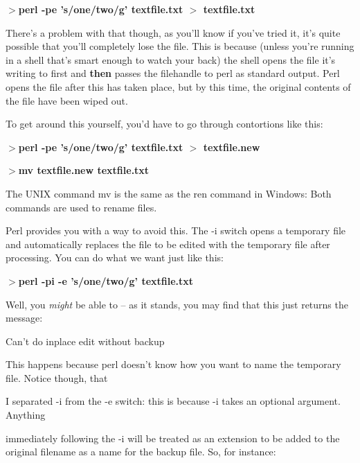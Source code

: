 \documentclass[a4paper,11pt]{book}
\begin{document}
\noindent 

\noindent $>$\textbf{perl -pe 's/one/two/g' textfile.txt $>$ textfile.txt}

\noindent 

\noindent There's a problem with that though, as you'll know if you've tried it, it's quite possible that you'll completely lose the file. This is because (unless you're running in a shell that's smart enough to watch your back) the shell opens the file it's writing to first and \textbf{then }passes the filehandle to perl as standard output. Perl opens the file after this has taken place, but by this time, the original contents of the file have been wiped out.

\noindent 

\noindent To get around this yourself, you'd have to go through contortions like this:

\noindent 

\noindent $>$\textbf{perl -pe 's/one/two/g' textfile.txt $>$ textfile.new}

\noindent $>$\textbf{mv textfile.new textfile.txt}

\noindent 

\noindent The UNIX command mv is the same as the ren command in Windows: Both commands are used to rename files.

\noindent 

\noindent Perl provides you with a way to avoid this. The -i switch opens a temporary file and automatically replaces the file to be edited with the temporary file after processing. You can do what we want just like this:

\noindent 

\noindent $>$\textbf{perl -pi -e 's/one/two/g' textfile.txt}

\noindent 

\noindent Well, you \textit{might }be able to -- as it stands, you may find that this just returns the message:

\noindent 

\noindent Can't do inplace edit without backup

\noindent 

\noindent This happens because perl doesn't know how you want to name the temporary file. Notice though, that

\noindent I separated -i from the -e switch: this is because -i takes an optional argument. Anything

\noindent immediately following the -i will be treated as an extension to be added to the original filename as a name for the backup file. So, for instance:
\end{document}
